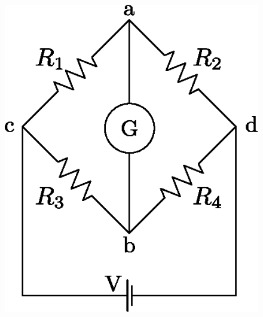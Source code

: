 \documentclass[letter,11pt]{article}
\begin{document}
\begin{enumerate}
\begin{enumerate}
        \begin{figure}[!h]
        \centering
        \includegraphics[scale=0.75]{resources/figura2.eps}
        \end{figure}

    \end{enumerate}

\end{enumerate}
\end{document}
